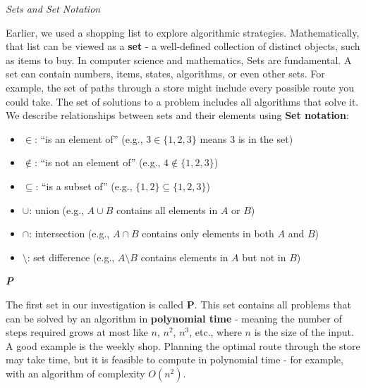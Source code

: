\documentclass[12pt]{report}
\begin{document}
\begin{center}
    \vspace{0cm}
    {\Large\itshape Sets and Set Notation\par}
\end{center}
Earlier, we used a shopping list to explore algorithmic strategies. Mathematically, that list can be viewed as a \textbf{set} - a well-defined collection of distinct objects, such as items to buy.
In computer science and mathematics, Sets are fundamental.
A set can contain numbers, items, states, algorithms, or even other sets.
For example, the set of paths through a store might include every possible route you could take.
The set of solutions to a problem includes all algorithms that solve it.
We describe relationships between sets and their elements using \textbf{Set notation}:
\begin{itemize}
    \item $\in$: “is an element of” (e.g., $3 \in \{1, 2, 3\}$ means 3 is in the set)
    \item $\notin$: “is not an element of” (e.g., $4 \notin \{1, 2, 3\}$)
    \item $\subseteq$: “is a subset of” (e.g., $\{1,2\} \subseteq \{1,2,3\}$)
    \item $\cup$: union (e.g., $A \cup B$ contains all elements in $A$ or $B$)
    \item $\cap$: intersection (e.g., $A \cap B$ contains only elements in both $A$ and $B$)
    \item $\setminus$: set difference (e.g., $A \setminus B$ contains elements in $A$ but not in $B$)
\end{itemize}

\begin{center}
    \vspace{0cm}
    {\Large\itshape \textbf{P}\par}
\end{center}
The first set in our investigation is called \textbf{P}. This set contains all problems that can be solved by an algorithm in \textbf{polynomial time} - meaning the number of steps required grows at most like $n$, $n^2$, $n^3$, etc., where $n$ is the size of the input.
A good example is the weekly shop.
Planning the optimal route through the store may take time, but it is feasible to compute in polynomial time - for example, with an algorithm of complexity $O(n^2)$.
\end{document}
